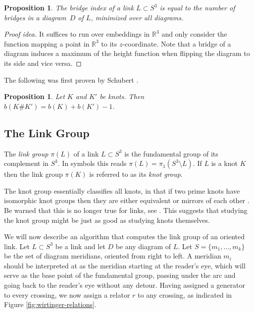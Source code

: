 \documentclass{article}
\newtheorem{proposition}[theorem]{Proposition}
\theoremstyle{definition}
\begin{document}
\begin{proposition}
The bridge index of a link $L \subset S^3$ is equal to the number of bridges in a diagram~$D$ of $L$, minimized over all diagrams.
\end{proposition}

\begin{proof}[Proof idea]
It suffices to run over embeddings in $\mathbb{R}^3$ and only consider the function mapping a point in $\mathbb{R}^3$ to its $z$-coordinate.
Note that a bridge of a diagram induces a maximum of the height function when flipping the diagram to its side and vice versa.
\end{proof}



The following was first proven by Schubert \cite{schubert1954}.

\begin{proposition}\label{prop:bridge-index-connected-sum}
Let $K$ and $K'$ be knots. Then $b(K\#K') = b( K ) + b(K') - 1$.
\end{proposition}


\subsection{The Link Group}\label{subsec:link-group}
The \textit{link group} $\pi(L)$ of a link $L \subset S^3$ is the fundamental group of its complement in $S^3$. In symbols this reads $\pi(L) = \pi_1(S^3 \setminus L)$. If $L$ is a knot $K$ then the link group $\pi(K)$ is referred to as its \textit{knot group}.

The knot group essentially classifies all knots, in that if two prime knots have isomorphic knot groups then they are either equivalent or mirrors of each other \cite{gordon1989}. Be warned that this is no longer true for links, see \cite{rolfsen2003}. This suggests that studying the knot group might be just as good as studying knots themselves.

We will now describe an algorithm that computes the link group of an oriented link. Let $L \subset S^3$ be a link and let $D$ be any diagram of $L$. Let $S = \{m_1, \dots, m_k\}$ be the set of diagram meridians, oriented from right to left. A meridian $m_i$ should be interpreted at as the meridian starting at the reader's eye, which will serve as the base point of the fundamental group, passing under the arc and going back to the reader's eye without any detour.
Having assigned a generator to every crossing, we now assign a relator $r$ to any crossing, as indicated in Figure \ref{fig:wirtinger-relations}.
\end{document}
